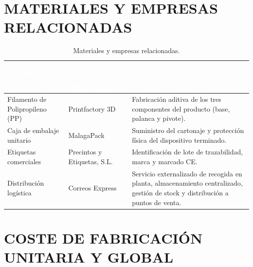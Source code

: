 \documentclass[11pt,a4paper]{article}
\begin{document}
\tableofcontents
\newpage

\listoftables
\thispagestyle{fancy}
\newpage




\section{MATERIALES Y EMPRESAS RELACIONADAS}

\begin{table}[H]
\centering
\renewcommand{\arraystretch}{1.3}
\begin{tabularx}{\textwidth}{|l|X|X|}
\hline
\rowcolor{ArthroTeal}
\textcolor{white}{\textbf{Material / Componente}} & \textcolor{white}{\textbf{Proveedor / Empresa Relacionada}} & \textcolor{white}{\textbf{Aplicación en el Diseño}} \\
\hline
Filamento de Polipropileno (PP) & Printfactory 3D & Fabricación aditiva de los tres componentes del producto (base, palanca y pivote). \\
\hline
Caja de embalaje unitario & MalagaPack & Suministro del cartonaje y protección física del dispositivo terminado. \\
\hline
Etiquetas comerciales & Precintos y Etiquetas, S.L. & Identificación de lote de trazabilidad, marca y marcado CE. \\
\hline
Distribución logística & Correos Express & Servicio externalizado de recogida en planta, almacenamiento centralizado, gestión de stock y distribución a puntos de venta. \\
\hline
\end{tabularx}
\caption{Materiales y empresas relacionadas.}
\label{tab:materiales-empresas}
\end{table}

\section{COSTE DE FABRICACIÓN UNITARIA Y GLOBAL}
\end{document}
